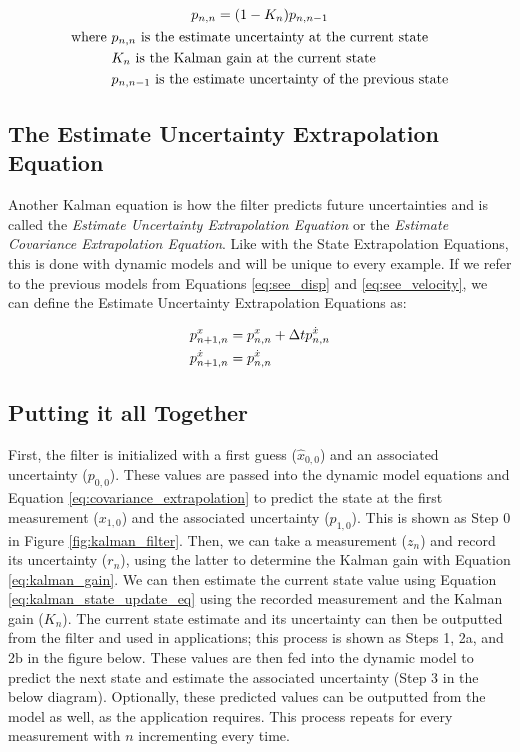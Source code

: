 \begin{gather}
    p_{n,n} = (1-K_n)p_{n,n-1} \\
    \begin{aligned}
        \text{where } &p_{n,n} \text{ is the estimate uncertainty at the current state} \\
                        &K_n \text{ is the Kalman gain at the current state} \\
                        &p_{n,n-1} \text{ is the estimate uncertainty of the previous state}
    \end{aligned} \notag
\end{gather}

\subsection{The Estimate Uncertainty Extrapolation Equation} 
Another Kalman equation is how the filter predicts future uncertainties and is called the \textit{Estimate Uncertainty Extrapolation Equation} or the \textit{Estimate Covariance Extrapolation Equation}.
Like with the State Extrapolation Equations, this is done with dynamic models and will be unique to every example.
If we refer to the previous models from Equations \ref{eq:see_disp} and \ref{eq:see_velocity}, we can define the Estimate Uncertainty Extrapolation Equations as:

\begin{gather}
    \labeq{covariance_extrapolation}
    \begin{aligned}
        p_{n+1,n}^x &= p_{n,n}^x + \Delta t p_{n,n}^{\dot{x}} \\
        p_{n+1,n}^{\dot{x}} &= p_{n,n}^{\dot{x}}
    \end{aligned}
\end{gather}

\subsection{Putting it all Together}
First, the filter is initialized with a first guess ($\hat{x}_{0,0}$) and an associated uncertainty ($p_{0,0}$).
These values are passed into the dynamic model equations and Equation \ref{eq:covariance_extrapolation} to predict the state at the first measurement ($x_{1,0}$) and the associated uncertainty ($p_{1,0}$).
This is shown as Step 0 in Figure \ref{fig:kalman_filter}.
Then, we can take a measurement ($z_n$) and record its uncertainty ($r_n$), using the latter to determine the Kalman gain with Equation \ref{eq:kalman_gain}.
We can then estimate the current state value using Equation \ref{eq:kalman_state_update_eq} using the recorded measurement and the Kalman gain ($K_n$).
The current state estimate and its uncertainty can then be outputted from the filter and used in applications; this process is shown as Steps 1, 2a, and 2b in the figure below.
These values are then fed into the dynamic model to predict the next state and estimate the associated uncertainty (Step 3 in the below diagram).
Optionally, these predicted values can be outputted from the model as well, as the application requires.
This process repeats for every measurement with $n$ incrementing every time.

